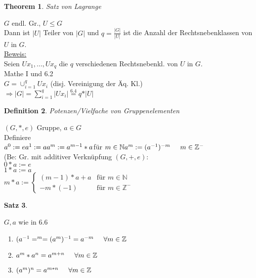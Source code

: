 \documentclass[a4paper,11pt]{article}
\newtheorem{definition}{Definition}[section]
\newtheorem{satz}[definition]{Satz}
\newtheorem{theo}[definition]{Theorem}
\newcommand{\hsp}{\hspace{5mm}}
\begin{document}
\begin{theo}
	Satz von Lagrange
\end{theo}
$G$ endl. Gr., $U\leq G$ \\
Dann ist $\vert U\vert$ Teiler von $\vert G\vert$ und $q=\frac{\vert G\vert}{\vert U\vert}$ ist die Anzahl der Rechtsnebenklassen von $U$ in $G$. \\
\underline{Beweis:} \\
Seien $Ux_1,...,Ux_q$ die $q$ verschiedenen Rechtsnebenkl. von $U$ in $G$. \\
Mathe I und 6.2 \\
$G=\cup_{i=1}^q Ux_i$ (disj. Vereinigung der Äq. Kl.) \\
$\Rightarrow\vert G\vert=\sum_{i=1}^q\vert Ux_i\vert\overset{6.4}{=}q*\vert U\vert$ 

\begin{definition}
	Potenzen/Vielfache von Gruppenelementen
\end{definition}
$(G,*,e)$ Gruppe, $a\in G$ \\
Definiere \\
$a^0:=e \\
a^1:=a \\
a^m:=a^{m-1}*a$\hsp für $m\in\mathbb{N} \\
a^m:=(a^{-1})^{-m}\hsp m\in\mathbb{Z}^-$ \\
(Be: Gr. mit additiver Verknüpfung $(G,+,e)$: \\
$0*a:=e$ \\
$1*a:=a$ \\
$m*a:=\left\{\begin{array}{ll}(m-1)*a+a & \text{für }m\in\mathbb{N} \\ -m*(-1) & \text{für } m\in\mathbb{Z}^-\end{array}\right.$ 

\newpage

\begin{satz}
\end{satz}
$G,a$ wie in 6.6
\begin{enumerate}[label=\alph*)]
	\item $(a^{-1}=^m=(a^m)^{-1}=a^{-m}\hsp\forall m\in\mathbb{Z}$
	\item $a^m*a^n=a^{m+n}\hsp\forall m\in\mathbb{Z}$
	\item $(a^m)^n=a^{m*n}\hsp\forall m\in\mathbb{Z}$
\end{enumerate}
\end{document}
